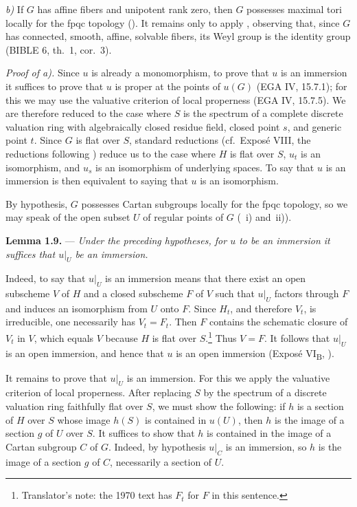 \smallskip
\noindent\textit{b)}
If \(G\) has affine fibers and unipotent rank zero, then \(G\)
possesses maximal tori locally for the fpqc topology (). It remains only to apply , observing that, since \(G\) has
connected, smooth, affine, solvable fibers, its Weyl group is the
identity group (BIBLE 6, th.~1, cor.~3).

\medskip
\noindent\textit{Proof of  a).}
Since \(u\) is already a monomorphism, to prove that \(u\) is an
immersion it suffices to prove that \(u\) is proper at the points of
\(u(G)\) (EGA IV, 15.7.1); for this we may use the valuative
criterion of local properness (EGA IV, 15.7.5). We are therefore
reduced to the case where \(S\) is the spectrum of a complete
discrete valuation ring with algebraically closed residue field,
closed point \(s\), and generic point \(t\). Since \(G\) is flat over
\(S\), standard reductions (cf.\ Exposé VIII, the reductions following )
reduce us to the case where \(H\) is flat over \(S\), \(u_t\) is an
isomorphism, and \(u_s\) is an isomorphism of underlying spaces. To
say that \(u\) is an immersion is then equivalent to saying that
\(u\) is an isomorphism.

By hypothesis, \(G\) possesses Cartan subgroups locally for the fpqc
topology, so we may speak of the open subset \(U\) of regular points
of \(G\) (~i) and~ii)).

\medskip
\noindent{}%
\textbf{Lemma 1.9.} --- \textit{Under the preceding hypotheses, for
\(u\) to be an immersion it suffices that \(u|_U\) be an immersion.}

Indeed, to say that \(u|_U\) is an immersion means that there exist
an open subscheme \(V\) of \(H\) and a closed subscheme \(F\) of
\(V\) such that \(u|_U\) factors through \(F\) and induces an
isomorphism from \(U\) onto \(F\). Since \(H_t\), and therefore
\(V_t\), is irreducible, one necessarily has \(V_t=F_t\). Then \(F\)
contains the schematic closure of \(V_t\) in \(V\), which equals
\(V\) because \(H\) is flat over \(S\).\footnote{Translator's note: the 1970 text has \(F_t\) for
\(F\) in this sentence.} Thus \(V=F\). It follows
that \(u|_U\) is an open immersion, and hence that \(u\) is an open
immersion (Exposé VI\textsubscript{B}, ).

It remains to prove that \(u|_U\) is an immersion. For this we apply
the valuative criterion of local properness. After replacing \(S\)
by the spectrum of a discrete valuation ring faithfully flat over
\(S\), we must show the following: if \(h\) is a section of \(H\)
over \(S\) whose image \(h(S)\) is contained in \(u(U)\), then \(h\)
is the image of a section \(g\) of \(U\) over \(S\). It suffices to
show that \(h\) is contained in the image of a Cartan subgroup \(C\)
of \(G\). Indeed, by hypothesis \(u|_C\) is an immersion, so \(h\)
is the image of a section \(g\) of \(C\), necessarily a section of
\(U\).

